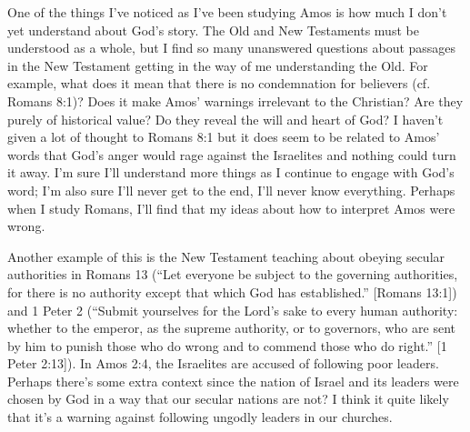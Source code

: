 One of the things I've noticed as I've been studying Amos is how much I don't
yet understand about God's story. The Old and New Testaments must be understood
as a whole, but I find so many unanswered questions about passages in the New
Testament getting in the way of me understanding the Old. For example, what does
it mean that there is no condemnation for believers (cf. Romans 8:1)? Does it
make Amos' warnings irrelevant to the Christian? Are they purely of historical
value? Do they reveal the will and heart of God? I haven't given a lot of
thought to Romans 8:1 but it does seem to be related to Amos' words that God's
anger would rage against the Israelites and nothing could turn it away. I'm sure
I'll understand more things as I continue to engage with God's word; I'm also
sure I'll never get to the end, I'll never know everything. Perhaps when I study
Romans, I'll find that my ideas about how to interpret Amos were wrong.

Another example of this is the New Testament teaching about obeying secular
authorities in Romans 13 (\enquote{Let everyone be subject to the governing
authorities, for there is no authority except that which God has established.}
[Romans 13:1]) and 1 Peter 2 (\enquote{Submit yourselves for the Lord's sake to
every human authority: whether to the emperor, as the supreme authority, or to
governors, who are sent by him to punish those who do wrong and to commend those
who do right.} [1 Peter 2:13]). In Amos 2:4, the Israelites are accused of
following poor leaders. Perhaps there's some extra context since the nation of
Israel and its leaders were chosen by God in a way that our secular nations are
not? I think it quite likely that it's a warning against following ungodly
leaders in our churches.


